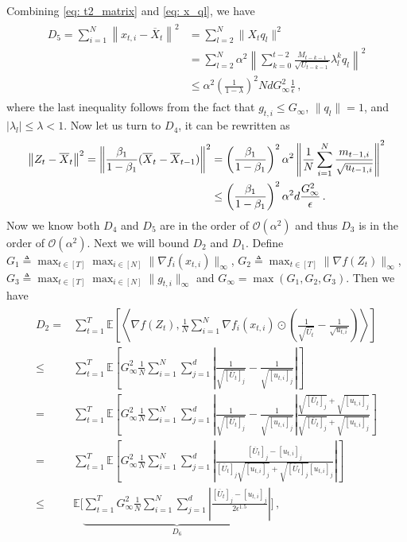 \documentclass[11pt]{article}
\begin{document}
Combining \eqref{eq: t2_matrix} and \eqref{eq: x_ql}, we have
\begin{align} \label{eq: T_5_bound}
\begin{split}
D_5 = 	\sum_{i=1}^N\left\| {  x_{t,i} -   \overline X_{t}}  \right\|^2 & = \sum_{l=2}^N \|X_t q_l\|^2 \\
& =  \sum_{l=2}^N \alpha^2 \left \| \sum_{k=0}^{t-2} \frac{M_{t-k-1}}{\sqrt{U_{t-k-1}}} \lambda_{l}^{k}  q_l\right\|^2 \\
& \leq \alpha^2 \left (\frac{1}{1-\lambda} \right)^2 Nd G_{\infty}^2 \frac{1}{\epsilon} \, ,
\end{split}
\end{align}
where the last inequality follows from the fact that $g_{t,i} \leq G_{\infty}$, $\|q_l\| = 1$, and $|\lambda_l| \leq \lambda < 1$.
Now let us turn to $D_4$, it can be rewritten as 
\begin{align}\notag
\left\|  Z_{t} -  \overline X_{t}\right\|^2  = \left\| \frac{\beta_1}{1-\beta_1} (\overline X_t - \overline X_{t-1}) \right \|^2 & =\left( \frac{\beta_1}{1-\beta_1}\right)^2 \alpha^2 \left \|\frac{1}{N}\sum_{i=1}^N \frac{m_{t-1,i}}{\sqrt{u_{t-1,i}}}\right\|^2\\
& \leq \left( \frac{\beta_1}{1-\beta_1}\right)^2 \alpha^2 d \frac{G_{\infty}^2}{\epsilon}\, .
\end{align}
Now we know both $D_4$ and $D_5$ are in the order of  $\mathcal{O}(\alpha^2)$ and thus $D_3$ is in the order of  $\mathcal{O}(\alpha^2)$.
Next we will bound $D_2$ and $D_1$. Define  $G_1   \triangleq \max_{t \in [T]} \max_{i \in [N]} \|\nabla f_i(x_{t,i})\|_{\infty}$, $G_2   \triangleq \max_{t \in [T]}  \|\nabla f(Z_t)\|_{\infty}$, $G_3  \triangleq \max_{t \in [T]} \max_{i \in [N]} \|g_{t,i}\|_{\infty}$ and $G_{\infty} = \max(G_1,G_2,G_3)$.
Then we have 
\begin{align}\label{eq:T_2_bound}
\begin{split}
D_2 =& \sum_{t=1}^T \mathbb E \left [ \left \langle \nabla f( Z_{t}), \frac{1}{N} \sum_{i=1}^N \nabla f_i( x_{t,i})\odot \left( \frac{1}{\sqrt{\overline U_{t}}} -\frac{1}{\sqrt{u_{t,i}}}  \right)  \right \rangle \right]  \\
\leq & \sum_{t=1}^T \mathbb E \left [  G_{\infty}^2  \frac{1}{N} \sum_{i=1}^N \sum_{j=1}^d \left| \frac{1}{\sqrt{[\overline U_{t}]_j}} -\frac{1}{\sqrt{[u_{t,i}]_{j}}}  \right| \right]  \\
= & \sum_{t=1}^T \mathbb E \left [  G_{\infty}^2  \frac{1}{N} \sum_{i=1}^N \sum_{j=1}^d \left| \frac{1}{\sqrt{[\overline U_{t}]_j}} -\frac{1}{\sqrt{[u_{t,i}]_{j}}}  \right| \frac{\sqrt{[\overline U_{t}]_j} + \sqrt{[u_{t,i}]_{j}} }{\sqrt{[\overline U_{t}]_j} + \sqrt{[u_{t,i}]_{j}}} \right] \\
= & \sum_{t=1}^T \mathbb E \left [  G_{\infty}^2  \frac{1}{N} \sum_{i=1}^N \sum_{j=1}^d \left| \frac{[\overline U_{t}]_j - [u_{t,i}]_{j} }{{[\overline U_{t}]_j}\sqrt{[u_{t,i}]_{j}} + \sqrt{[\overline U_{t}]_j}{[u_{t,i}]_{j}}}  \right| \right]  \\
\leq &   \mathbb E \bigg [ \underbrace{ \sum_{t=1}^T  G_{\infty}^2  \frac{1}{N} \sum_{i=1}^N \sum_{j=1}^d \left| \frac{[\overline U_{t}]_j - [u_{t,i}]_{j} }{2 \epsilon^{1.5}}  \right| }_{D_6} \bigg ] \, , 
\end{split}
\end{align}
\end{document}
